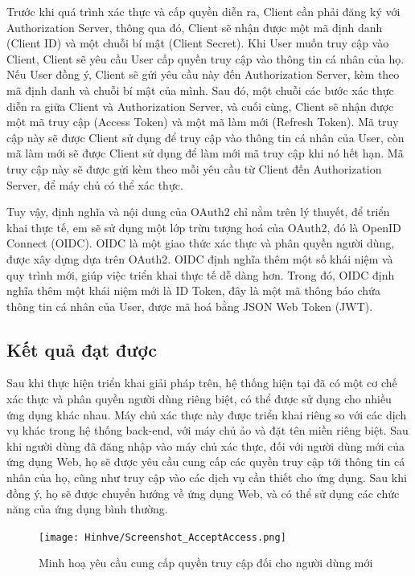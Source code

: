 \documentclass[../DoAn.tex]{subfiles}
\begin{document}
Trước khi quá trình xác thực và cấp quyền diễn ra, Client cần phải đăng ký với Authorization Server, thông qua đó, Client sẽ nhận được một mã định danh (Client ID)
và một chuỗi bí mật (Client Secret). Khi User muốn truy cập vào Client, Client sẽ yêu cầu User cấp quyền truy cập vào thông tin cá nhân của họ. Nếu User đồng ý, Client sẽ gửi
yêu cầu này đến Authorization Server, kèm theo mã định danh và chuỗi bí mật của mình. Sau đó, một chuỗi các bước xác thực diễn ra giữa Client và Authorization Server,
và cuối cùng, Client sẽ nhận được một mã truy cập (Access Token) và một mã làm mới (Refresh Token). Mã truy cập này sẽ được Client sử dụng để truy cập vào thông tin cá nhân của User,
còn mã làm mới sẽ được Client sử dụng để làm mới mã truy cập khi nó hết hạn. Mã truy cập này sẽ được gửi kèm theo mỗi yêu cầu từ Client đến Authorization Server, để máy chủ có thể xác thực.

Tuy vậy, định nghĩa và nội dung của OAuth2 chỉ nằm trên lý thuyết, để triển khai thực tế, em sẽ sử dụng một lớp trừu tượng hoá của OAuth2, đó là OpenID Connect (OIDC).
OIDC là một giao thức xác thực và phân quyền người dùng, được xây dựng dựa trên OAuth2. OIDC định nghĩa thêm một số khái niệm và quy trình mới, giúp việc triển khai
thực tế dễ dàng hơn. Trong đó, OIDC định nghĩa thêm một khái niệm mới là ID Token, đây là một mã thông báo chứa thông tin cá nhân của User, được mã hoá bằng JSON Web Token (JWT).

\newpage

\subsection{Kết quả đạt được}
\label{subsection:5.2.3}

Sau khi thực hiện triển khai giải pháp trên, hệ thống hiện tại đã có một cơ chế xác thực và phân quyền người dùng riêng biệt, có thể được sử dụng cho nhiều ứng dụng khác nhau.
Máy chủ xác thực này được triển khai riêng so với các dịch vụ khác trong hệ thống back-end, với máy chủ ảo và đặt tên miền riêng biệt. Sau khi người dùng đã đăng nhập vào máy chủ xác thực,
đối với người dùng mới của ứng dụng Web, họ sẽ được yêu cầu cung cấp các quyền truy cập tới thông tin cá nhân của họ, cũng như truy cập vào các
dịch vụ cần thiết cho ứng dụng. Sau khi đồng ý, họ sẽ được chuyển hướng về ứng dụng Web, và có thể sử dụng các chức năng của ứng dụng bình thường.

\begin{figure}[H]
    \centering
    \texttt{[image: Hinhve/Screenshot\_AcceptAccess.png]}
    \caption{Minh hoạ yêu cầu cung cấp quyền truy cập đối cho người dùng mới}
    \label{fig:Result_GithubAction}
\end{figure}

\newpage
\end{document}
